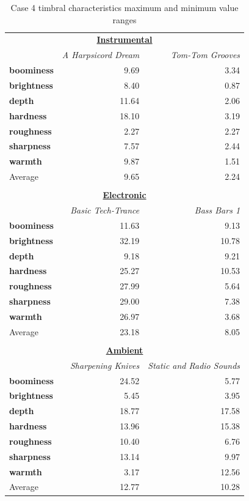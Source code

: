 \begin{table}[ht]
    \caption[Case 4 timbral characteristics max and min ranges]{Case 4 timbral characteristics maximum and minimum value ranges}\label{tab:case_4}
    \begin{tabular*}{\textwidth}{@{\extracolsep{\fill}}lrr}
        \toprule
        \multicolumn{3}{c}{\textbf{\underline{Instrumental}}} \\
        & \emph{A Harpsicord Dream} & \emph{Tom-Tom Grooves} \\
        \midrule
        \textbf{boominess} & 9.69 & 3.34 \\
        \textbf{brightness} & 8.40 & 0.87 \\
        \textbf{depth} & 11.64 & 2.06 \\
        \textbf{hardness} & 18.10 & 3.19 \\
        \textbf{roughness} & 2.27 & 2.27 \\
        \textbf{sharpness} & 7.57 & 2.44 \\
        \textbf{warmth} & 9.87 & 1.51 \\
        \midrule
        Average & 9.65 & 2.24 \\
        \midrule \\
        \multicolumn{3}{c}{\textbf{\underline{Electronic}}} \\
        & \emph{Basic Tech-Trance} & \emph{Bass Bars 1} \\
        \midrule
        \textbf{boominess} & 11.63 & 9.13 \\
        \textbf{brightness} & 32.19 & 10.78 \\
        \textbf{depth} & 9.18 & 9.21 \\
        \textbf{hardness} & 25.27 & 10.53 \\
        \textbf{roughness} & 27.99 & 5.64 \\
        \textbf{sharpness} & 29.00 & 7.38 \\
        \textbf{warmth} & 26.97 & 3.68 \\
        \midrule
        Average & 23.18 & 8.05 \\
        \midrule \\
        \multicolumn{3}{c}{\textbf{\underline{Ambient}}} \\
        & \emph{Sharpening Knives} & \emph{Static and Radio Sounds} \\
        \midrule
        \textbf{boominess} & 24.52 & 5.77 \\
        \textbf{brightness} & 5.45 & 3.95 \\
        \textbf{depth} & 18.77 & 17.58 \\
        \textbf{hardness} & 13.96 & 15.38 \\
        \textbf{roughness} & 10.40 & 6.76 \\
        \textbf{sharpness} & 13.14 & 9.97 \\
        \textbf{warmth} & 3.17 & 12.56 \\
        \midrule
        Average & 12.77 & 10.28 \\
        \bottomrule
    \end{tabular*}
\end{table}
\clearpage

